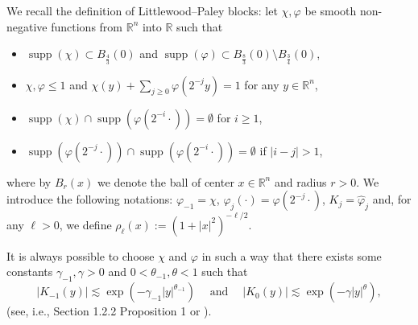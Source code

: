 \documentclass{article}
\newcommand{\assign}{:=}
\newcommand{\tmop}[1]{\ensuremath{\operatorname{#1}}}
\begin{document}
We recall the definition of Littlewood--Paley blocks: let $\chi, \varphi$ be
smooth non-negative functions from $\mathbb{R}^n$ into $\mathbb{R}$ such that
\begin{itemize}
  \item $\tmop{supp} (\chi) \subset B_{\frac{4}{3}} (0)$ and $\tmop{supp}
  (\varphi) \subset B_{\frac{8}{3}} (0) \setminus B_{\frac{3}{4}} (0)$,
  
  \item $\chi, \varphi \leqslant 1$ and $\chi (y) + \sum_{j \geq 0} \varphi
  (2^{- j} y) = 1$ for any $y \in \mathbb{R}^n$,
  
  \item $\tmop{supp} (\chi) \cap \tmop{supp} (\varphi (2^{- i} \cdot)) =
  \emptyset$ for $i \geqslant 1$,
  
  \item $\tmop{supp} (\varphi (2^{- j} \cdot)) \cap \tmop{supp} (\varphi (2^{-
  i} \cdot)) = \emptyset$ if $| i - j | > 1$,
\end{itemize}
where by $B_r (x)$ we denote the ball of center $x \in \mathbb{R}^n$ and
radius $r > 0$. We introduce the following notations: $\varphi_{- 1} = \chi$,
$\varphi_j (\cdot) = \varphi (2^{- j} \cdot)$, $K_j = \hat{\varphi}_j$ and,
for any $\ell > 0$, we define $\rho_{\ell} (x) \assign (1 + | x |^2)^{- \ell /
2}$.

\begin{remark}
  \label{remark_decay}It is always possible to choose $\chi$ and $\varphi$ in
  such a way that there exists some constants $\gamma_{- 1}, \gamma > 0$ and
  $0 < \theta_{- 1}, \theta < 1$ such that
  \[ | K_{- 1} (y) | \lesssim \exp (- \gamma_{- 1} | y |^{\theta_{- 1}})
     \quad \tmop{and} \quad | K_0 (y) | \lesssim \exp (- \gamma | y
     |^{\theta}), \]
  (see, i.e., {\cite{SchmeisserTriebel}} Section 1.2.2 Proposition 1 or
  {\cite{mourrat_plane_2015}}).
\end{remark}
\end{document}
